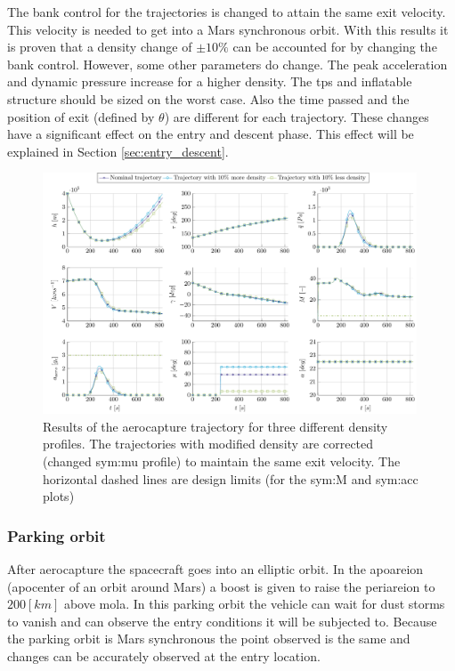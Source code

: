 The bank control for the trajectories is changed to attain the same exit velocity. This velocity is needed to get into a Mars synchronous orbit. With this results it is proven that a density change of $\pm 10\%$ can be accounted for by changing the bank control. However, some other parameters do change. The peak acceleration and dynamic pressure increase for a higher density. The \gls{tps} and inflatable structure should be sized on the worst case. Also the time passed and the position of exit (defined by $\theta$) are different for each trajectory. These changes have a significant effect on the entry and descent phase. This effect will be explained in Section \ref{sec:entry_descent}.
\begin{figure}
	\centering
	\includegraphics[width=0.99\textwidth]{Figure/Orbit/sensitivity_aerocapture.pdf}
	\caption{Results of the aerocapture trajectory for three different density profiles. The trajectories with modified density are corrected (changed \gls{sym:mu} profile) to maintain the same exit velocity. The horizontal dashed lines are design limits (for the \gls{sym:M} and \gls{sym:acc} plots) }
	\label{fig:orbit_aerocapture_data}
\end{figure}

\subsubsection{Parking orbit}\label{sec:parking_orbit}
After aerocapture the spacecraft goes into an elliptic orbit. In the apoareion (apocenter of an orbit around Mars) a boost is given to raise the periareion to $200 \left[km\right]$ above \gls{mola}. In this parking orbit the vehicle can wait for dust storms to vanish and can observe the entry conditions it will be subjected to. Because the parking orbit is Mars synchronous the point observed is the same and changes can be accurately observed at the entry location. 

